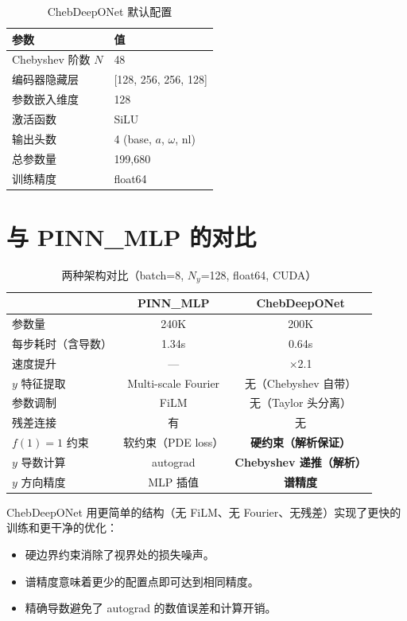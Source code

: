 \documentclass[11pt,a4paper]{article}
\begin{document}
\begin{table}[h]
\centering
\caption{ChebDeepONet 默认配置}
\label{tab:config}
\begin{tabular}{ll}
\toprule
参数 & 值 \\
\midrule
Chebyshev 阶数 $N$ & 48 \\
编码器隐藏层 & [128, 256, 256, 128] \\
参数嵌入维度 & 128 \\
激活函数 & SiLU \\
输出头数 & 4 (base, $a$, $\omega$, nl) \\
总参数量 & 199,680 \\
训练精度 & float64 \\
\bottomrule
\end{tabular}
\end{table}

\section{与 PINN\_MLP 的对比}

\begin{table}[h]
\centering
\caption{两种架构对比（batch=8, $N_y$=128, float64, CUDA）}
\label{tab:comparison}
\begin{tabular}{lcc}
\toprule
 & PINN\_MLP & ChebDeepONet \\
\midrule
参数量 & 240K & 200K \\
每步耗时（含导数） & 1.34s & 0.64s \\
速度提升 & — & $\times$2.1 \\
$y$ 特征提取 & Multi-scale Fourier & 无（Chebyshev 自带） \\
参数调制 & FiLM & 无（Taylor 头分离） \\
残差连接 & 有 & 无 \\
$f(1)=1$ 约束 & 软约束（PDE loss） & \textbf{硬约束（解析保证）} \\
$y$ 导数计算 & autograd & \textbf{Chebyshev 递推（解析）} \\
$y$ 方向精度 & MLP 插值 & \textbf{谱精度} \\
\bottomrule
\end{tabular}
\end{table}

ChebDeepONet 用更简单的结构（无 FiLM、无 Fourier、无残差）实现了更快的训练和更干净的优化：
\begin{itemize}
    \item 硬边界约束消除了视界处的损失噪声。
    \item 谱精度意味着更少的配置点即可达到相同精度。
    \item 精确导数避免了 autograd 的数值误差和计算开销。
\end{itemize}
\end{document}
